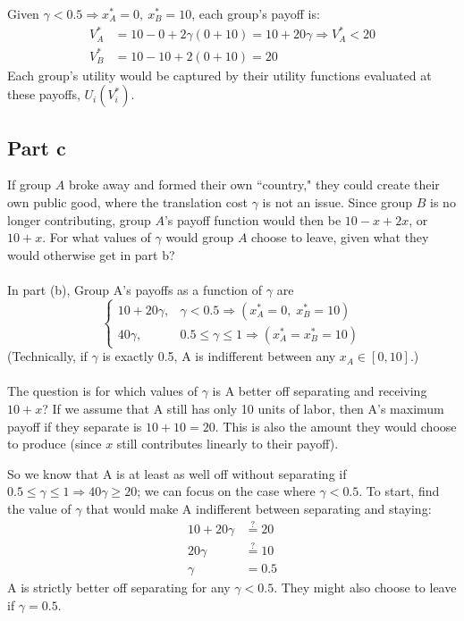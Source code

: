 \documentclass[10pt]{article}
\begin{document}
Given $\gamma < 0.5 \Longrightarrow x_A^*=0, \: x_B^* = 10$, each group's payoff is:
\[
\begin{aligned}
	V_A^* &= 10 - 0 + 2\gamma(0 + 10) = 10 + 20\gamma \Longrightarrow V_A^* < 20\\
	V_B^* &= 10 - 10 + 2(0 + 10) = 20
\end{aligned}
\]
Each group's utility would be captured by their utility functions evaluated at these payoffs, $U_i(V_i^*)$.


\newpage

\subsection*{Part c} If group $A$ broke away and formed their own ``country," they could create their own public good, where the translation cost $\gamma$ is not an issue. Since group $B$ is no longer contributing, group $A$'s payoff function would then be $10-x+2x$, or $10+x$. For what values of $\gamma$ would group $A$ choose to leave, given what they would otherwise get in part b?
\\ \\
In part (b), Group A's payoffs as a function of $\gamma$ are
\[
\begin{cases}
	10 + 20\gamma, & \gamma < 0.5 \Longrightarrow (x_A^* = 0, \; x_B^*=10)\\
	40\gamma, & 0.5 \leq \gamma \leq 1 \Longrightarrow (x_A^* = x_B^* = 10)
\end{cases}
\]
(Technically, if $\gamma$ is exactly 0.5, A is indifferent between any $x_A \in \left[0, 10\right]$.) 
\\ \\
The question is for which values of $\gamma$ is A better off separating and receiving $10 + x$? If we assume that A still has only 10 units of labor, then A's maximum payoff if they separate is $10 + 10 = 20$. This is also the amount they would choose to produce (since $x$ still contributes linearly to their payoff). 

So we know that A is at least as well off without separating if $0.5 \leq \gamma \leq 1 \Longrightarrow 40\gamma \geq 20$; we can focus on the case where $\gamma < 0.5$. To start, find the value of $\gamma$ that would make A indifferent between separating and staying:
\[
\begin{aligned}
	10 + 20\gamma &\overset{?}{=} 20 \\
	20\gamma &\overset{?}{=} 10 \\
	\gamma &= 0.5
\end{aligned}
\]
A is strictly better off separating for any $\gamma < 0.5$. They might also choose to leave if $\gamma = 0.5$.
\end{document}
